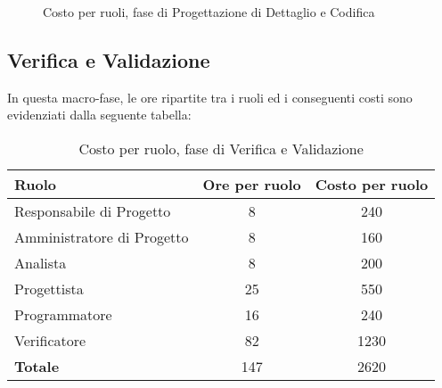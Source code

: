 \begin{figure}[h]
\centering
{}
\caption{Costo per ruoli, fase di Progettazione di Dettaglio e Codifica}
\end{figure}

\newpage
\subsection{Verifica e Validazione}
In questa macro-fase, le ore ripartite tra i ruoli ed i conseguenti costi sono evidenziati dalla seguente tabella:

\begin{table}[h]
\centering
\begin{tabular}{|l|c|c|}
	\toprule
	\textbf{Ruolo} & \textbf{Ore per ruolo} & \textbf{Costo per ruolo} \\
		
	\midrule
	Responsabile di Progetto & 8 & 240 \\
	Amministratore di Progetto & 8 & 160 \\ 
	Analista & 8 & 200 \\
	Progettista & 25 & 550 \\
	Programmatore & 16 & 240 \\
	Verificatore & 82 & 1230 \\
	\midrule
	\textbf{Totale} & 147 & 2620 \\
		
	\bottomrule
\end{tabular}
\caption{Costo per ruolo, fase di Verifica e Validazione}
\end{table}

